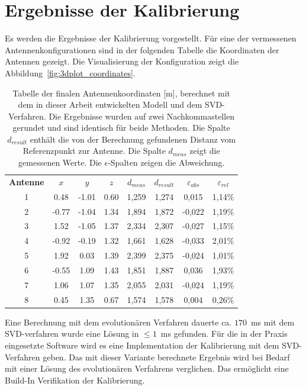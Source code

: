 %
\section{Ergebnisse der Kalibrierung}
\label{sec:calibrationResults}
%
Es werden die Ergebnisse der Kalibrierung vorgestellt. Für eine der vermessenen Antennenkonfigurationen sind in der folgenden Tabelle die Koordinaten der Antennen gezeigt. Die Visualisierung der Konfiguration zeigt die Abbildung~\ref{fig:3dplot_coordinates}.
%
\begin{table} [ht]
	\begin{center}
		\begin{tabular}{cccccccc}
		      \textbf{Antenne} & \textbf{$x$} & \textbf{$y$} & \textbf{$z$} & \textbf{$d_{meas}$} & \textbf{$d_{result}$}& \textbf{$\varepsilon_{abs}$} & \textbf{$\varepsilon_{rel}$} \\
		      1 & 0.48		& -1.01	& 0.60 & 1,259 & 1,274& 0,015 & 1,14\% \\
		      2 & -0.77 	& -1.04 	& 1.34 & 1,894 & 1,872 & -0,022 & 1,19\% \\
		      3 & 1.52  	& -1.05 	& 1.37 & 2,334 & 2,307 & -0,027 & 1,15\% \\
		      4 & -0.92 	& -0.19 	& 1.32 & 1,661 & 1,628 & -0,033 & 2,01\% \\
		      5 & 1.92 		&  0.03 	& 1.39 & 2,399 & 2,375 & -0,024 & 1,01\% \\
		      6 & -0.55 	&  1.09 	& 1.43 & 1,851 & 1,887 & 0,036 & 1,93\% \\
		      7 & 1.06 		&  1.07 	& 1.35 & 2,055 & 2,031 & -0,024 & 1,19\% \\
		      8 & 0.45 		&  1.35 	& 0.67 & 1,574 & 1,578 & 0,004 & 0,26\% \\					
%
		\end{tabular}
		\caption[Finale Antennen Koordinaten]{Tabelle der finalen Antennenkoordinaten [m], berechnet mit dem in dieser Arbeit entwickelten Modell und dem SVD-Verfahren. Die Ergebnisse wurden auf zwei Nachkommastellen gerundet und sind identisch für beide Methoden. Die Spalte $d_{result}$ enthält die von der Berechnung gefundenen Distanz vom Referenzpunkt zur Antenne. Die Spalte $d_{meas}$ zeigt die gemessenen Werte. Die $\epsilon$-Spalten zeigen die Abweichung.}
		\label{tab:FinalCoords}
	\end{center}
\end{table}
%
Eine Berechnung mit dem evolutionären Verfahren dauerte ca. $170$~ms mit dem SVD-verfahren wurde eine Lösung in $\le 1$~ms gefunden. Für die in der Praxis eingesetzte Software wird es eine Implementation der Kalibrierung mit dem SVD-Verfahren geben. Das mit dieser Variante berechnete Ergebnis wird bei Bedarf mit einer Lösung des evolutionären Verfahrens verglichen. Das ermöglicht eine Build-In Verifikation der Kalibrierung.\\

